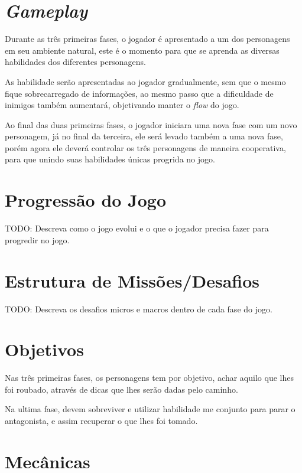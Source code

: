 \section{\textit{Gameplay}}

Durante as três primeiras fases, o jogador é apresentado a um dos personagens em seu ambiente natural, este é o momento para que se aprenda as diversas habilidades dos diferentes personagens.

As habilidade serão apresentadas ao jogador gradualmente, sem que o mesmo fique sobrecarregado de informações, ao mesmo passo que a dificuldade de inimigos também aumentará, objetivando manter o \textit{flow} do jogo.

Ao final das duas primeiras fases, o jogador iniciara uma nova fase com um novo personagem, já no  final da terceira, ele será levado também a uma nova fase, porém agora ele deverá controlar os três personagens de maneira cooperativa, para que unindo suas habilidades únicas progrida no jogo.




\section{Progressão do Jogo}

TODO: Descreva como o jogo evolui e o que o jogador precisa fazer para progredir no jogo.

\section{Estrutura de Missões/Desafios}

TODO: Descreva os desafios micros e macros dentro de cada fase do jogo.

\section{Objetivos}

Nas três primeiras fases, os personagens tem por objetivo, achar aquilo que lhes foi roubado, através de dicas que lhes serão dadas pelo caminho.

Na ultima fase, devem sobreviver e utilizar habilidade me conjunto para parar o antagonista, e assim recuperar o que lhes foi tomado.

\section{Mecânicas}

